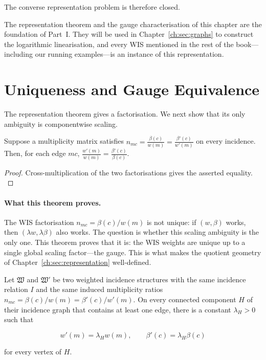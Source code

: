 The converse representation problem is therefore closed.

The representation theorem and the gauge characterisation of this chapter are the foundation of Part~I. They will be used in Chapter~\ref{ch:sec:graphs} to construct the logarithmic linearisation, and every WIS mentioned in the rest of the book---including our running examples---is an instance of this representation.


\section{Uniqueness and Gauge Equivalence}\label{ch:sec:gauge}

The representation theorem gives a factorisation. We next show that its
only ambiguity is componentwise scaling.

\begin{lemma}\label{ch:lem:edge-ratios}
Suppose a multiplicity matrix satisfies
\(n_{mc}=\frac{\beta(c)}{w(m)}=\frac{\beta'(c)}{w'(m)}\) on every
incidence.  Then, for each edge \(mc\),
\(\frac{w'(m)}{w(m)}=\frac{\beta'(c)}{\beta(c)}.\)
\end{lemma}

\begin{proof}
Cross-multiplication of the two factorisations gives the asserted
equality. \(\)
\end{proof}

\paragraph{What this theorem proves.}
The WIS factorisation $n_{mc}=\beta(c)/w(m)$ is not unique: if $(w,\beta)$ works, then $(\lambda w,\lambda\beta)$ also works.  The question is whether this scaling ambiguity is the only one.  This theorem proves that it is: the WIS weights are unique up to a single global scaling factor---the gauge.  This is what makes the quotient geometry of Chapter~\ref{ch:sec:representation} well-defined.

\begin{theorem}\label{ch:thm:uniqueness}
Let \(\mathfrak W\) and \(\mathfrak W'\) be two weighted incidence
structures with the same incidence relation \(I\) and the same induced
multiplicity ratios
\(n_{mc}=\beta(c)/w(m)=\beta'(c)/w'(m)\).  On every connected component
\(H\) of their incidence graph that contains at least one edge, there is
a constant \(\lambda_H>0\) such
that

\[
w'(m)=\lambda_H w(m),\qquad
\beta'(c)=\lambda_H\beta(c)
\]

for every vertex of \(H\).
\end{theorem}

